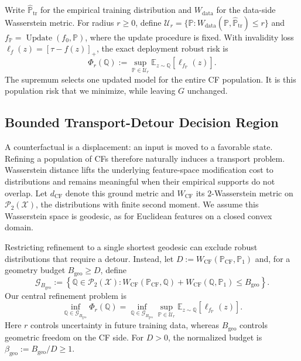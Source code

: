 Write $\widehat{\mathbb P}_{\mathrm{tr}}$ for the empirical training distribution and $W_{\mathrm{data}}$ for the data-side Wasserstein metric.
For radius $r\ge0$, define $\mathcal U_r=\{\mathbb P:W_{\mathrm{data}}(\mathbb P,\widehat{\mathbb P}_{\mathrm{tr}})\le r\}$ and $f_{\mathbb P}=\operatorname{Update}(f_0,\mathbb P)$, where the update procedure is fixed.
With invalidity loss $\ell_f(z)=[\tau-f(z)]_+$, the exact deployment robust risk is
\begin{equation}
\Phi_r(\mathbb Q)
:=\sup_{\mathbb P\in\mathcal U_r}
\mathbb E_{z\sim\mathbb Q}[\ell_{f_{\mathbb P}}(z)].
\label{eq:new-robust-risk}
\end{equation}
The supremum selects one updated model for the entire CF population.
It is this population risk that we minimize, while leaving $G$ unchanged.

\subsection{Bounded Transport-Detour Decision Region}
\label{sec:new-geometry}

A counterfactual is a displacement: an input is moved to a favorable state.
Refining a population of CFs therefore naturally induces a transport problem.
Wasserstein distance lifts the underlying feature-space modification cost to distributions and remains meaningful when their empirical supports do not overlap.
Let $d_{\mathrm{CF}}$ denote this ground metric and $W_{\mathrm{CF}}$ its $2$-Wasserstein metric on $\mathcal P_2(\mathcal X)$, the distributions with finite second moment.
We assume this Wasserstein space is geodesic, as for Euclidean features on a closed convex domain.

Restricting refinement to a single shortest geodesic can exclude robust distributions that require a detour.
Instead, let $D:=W_{\mathrm{CF}}(\mathbb P_{\mathrm{CF}},\mathbb P_1)$ and, for a geometry budget $B_{\mathrm{geo}}\ge D$, define
\begin{equation}
\mathcal G_{B_{\mathrm{geo}}}
:=\left\{\mathbb Q\in\mathcal P_2(\mathcal X):
W_{\mathrm{CF}}(\mathbb P_{\mathrm{CF}},\mathbb Q)
+W_{\mathrm{CF}}(\mathbb Q,\mathbb P_1)\le B_{\mathrm{geo}}\right\}.
\label{eq:new-region}
\end{equation}
Our central refinement problem is
\begin{equation}
\boxed{\inf_{\mathbb Q\in\mathcal G_{B_{\mathrm{geo}}}}\Phi_r(\mathbb Q)
=\inf_{\mathbb Q\in\mathcal G_{B_{\mathrm{geo}}}}
\sup_{\mathbb P\in\mathcal U_r}
\mathbb E_{z\sim\mathbb Q}[\ell_{f_{\mathbb P}}(z)].}
\label{eq:new-wro}
\end{equation}
Here $r$ controls uncertainty in future training data, whereas $B_{\mathrm{geo}}$ controls geometric freedom on the CF side.
For $D>0$, the normalized budget is $\beta_{\mathrm{geo}}:=B_{\mathrm{geo}}/D\ge1$.

